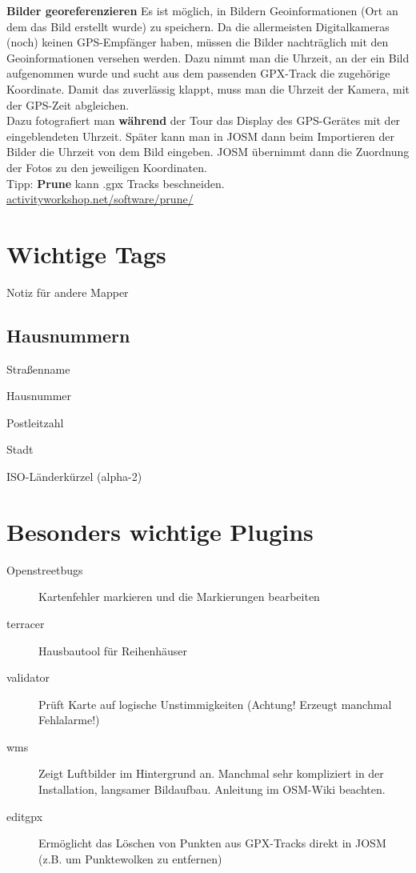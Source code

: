 \documentclass[a4paper,11pt,notumble]{leaflet}
\begin{document}
\textbf{Bilder georeferenzieren} Es ist möglich, in Bildern Geoinformationen (Ort an dem das Bild erstellt wurde) zu 
speichern. Da die allermeisten Digitalkameras (noch) keinen GPS-Empfänger haben, müssen die Bilder nachträglich mit 
den Geoinformationen versehen werden. Dazu nimmt man die Uhrzeit, an der ein Bild aufgenommen wurde und sucht aus dem 
passenden GPX-Track die zugehörige Koordinate. Damit das zuverlässig klappt, muss man die Uhrzeit der Kamera, mit der 
GPS-Zeit abgleichen. \\
Dazu fotografiert man \textbf{während} der Tour das Display des GPS-Gerätes mit der eingeblendeten Uhrzeit. Später 
kann man in JOSM dann beim Importieren der Bilder die Uhrzeit von dem Bild eingeben. JOSM übernimmt dann die Zuordnung
der Fotos zu den jeweiligen Koordinaten. \\

Tipp: \textbf{Prune} kann .gpx Tracks beschneiden. 
\href{http://activityworkshop.net/software/prune/}{activityworkshop.net/software/prune/}

\newpage
\section*{Wichtige Tags}
\begin{description}
\item[note=*] Notiz für andere Mapper
\subsection{Hausnummern}
\item[addr:street=*] Straßenname
\item[addr:housenumber=*] Hausnummer
\item[addr:postcode=*] Postleitzahl
\item[addr:city=*] Stadt
\item[addr:country=*] ISO-Länderkürzel (alpha-2)
\item
\end{description}

\section*{Besonders wichtige Plugins}
\begin{description}
\item[Openstreetbugs] Kartenfehler markieren und die Markierungen bearbeiten
\item[terracer] Hausbautool für Reihenhäuser
\item[validator] Prüft Karte auf logische Unstimmigkeiten
(Achtung! Erzeugt manchmal Fehlalarme!) 
\item[wms] Zeigt Luftbilder im Hintergrund an. Manchmal sehr kompliziert in der Installation, langsamer Bildaufbau. 
Anleitung im OSM-Wiki beachten.
\item[editgpx] Ermöglicht das Löschen von Punkten aus GPX-Tracks direkt in JOSM (z.B. um Punktewolken zu entfernen)
\end{description}
\end{document}
